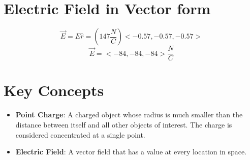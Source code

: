 \documentclass{article}
\begin{document}
\section*{Electric Field in Vector form}
\[
\vec{E}=E\hat{r}=(147\frac{N}{C})<-0.57, -0.57, -0.57>
\]
\[
\vec{E}=<-84, -84, -84>\frac{N}{C}
\]

\section*{Key Concepts}
\begin{itemize}
    \item \textbf{Point Charge}: A charged object whose radius is much smaller than the distance between itself and all other objects of interest. The charge is considered concentrated at a single point.
    \item \textbf{Electric Field}: A vector field that has a value at every location in space.
\end{itemize}
\end{document}
